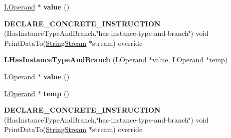 \begin{DoxyCompactItemize}
\item 
\hyperlink{classv8_1_1internal_1_1_l_operand}{L\+Operand} $\ast$ {\bfseries value} ()\hypertarget{classv8_1_1internal_1_1_l_has_instance_type_and_branch_a33c5f4ece667b3cc856cdba5e0ffa217}{}\label{classv8_1_1internal_1_1_l_has_instance_type_and_branch_a33c5f4ece667b3cc856cdba5e0ffa217}

\item 
{\bfseries D\+E\+C\+L\+A\+R\+E\+\_\+\+C\+O\+N\+C\+R\+E\+T\+E\+\_\+\+I\+N\+S\+T\+R\+U\+C\+T\+I\+ON} (Has\+Instance\+Type\+And\+Branch,\char`\"{}has-\/instance-\/type-\/and-\/branch\char`\"{}) void Print\+Data\+To(\hyperlink{classv8_1_1internal_1_1_string_stream}{String\+Stream} $\ast$stream) override\hypertarget{classv8_1_1internal_1_1_l_has_instance_type_and_branch_a3d0add74c6215d7b2c0629955bf970a3}{}\label{classv8_1_1internal_1_1_l_has_instance_type_and_branch_a3d0add74c6215d7b2c0629955bf970a3}

\item 
{\bfseries L\+Has\+Instance\+Type\+And\+Branch} (\hyperlink{classv8_1_1internal_1_1_l_operand}{L\+Operand} $\ast$value, \hyperlink{classv8_1_1internal_1_1_l_operand}{L\+Operand} $\ast$temp)\hypertarget{classv8_1_1internal_1_1_l_has_instance_type_and_branch_a724bc7736ff63c67353a3b18169626c5}{}\label{classv8_1_1internal_1_1_l_has_instance_type_and_branch_a724bc7736ff63c67353a3b18169626c5}

\item 
\hyperlink{classv8_1_1internal_1_1_l_operand}{L\+Operand} $\ast$ {\bfseries value} ()\hypertarget{classv8_1_1internal_1_1_l_has_instance_type_and_branch_a33c5f4ece667b3cc856cdba5e0ffa217}{}\label{classv8_1_1internal_1_1_l_has_instance_type_and_branch_a33c5f4ece667b3cc856cdba5e0ffa217}

\item 
\hyperlink{classv8_1_1internal_1_1_l_operand}{L\+Operand} $\ast$ {\bfseries temp} ()\hypertarget{classv8_1_1internal_1_1_l_has_instance_type_and_branch_a8cdfd4f289c9986c7e237c421380072f}{}\label{classv8_1_1internal_1_1_l_has_instance_type_and_branch_a8cdfd4f289c9986c7e237c421380072f}

\item 
{\bfseries D\+E\+C\+L\+A\+R\+E\+\_\+\+C\+O\+N\+C\+R\+E\+T\+E\+\_\+\+I\+N\+S\+T\+R\+U\+C\+T\+I\+ON} (Has\+Instance\+Type\+And\+Branch,\char`\"{}has-\/instance-\/type-\/and-\/branch\char`\"{}) void Print\+Data\+To(\hyperlink{classv8_1_1internal_1_1_string_stream}{String\+Stream} $\ast$stream) override\hypertarget{classv8_1_1internal_1_1_l_has_instance_type_and_branch_a3d0add74c6215d7b2c0629955bf970a3}{}\label{classv8_1_1internal_1_1_l_has_instance_type_and_branch_a3d0add74c6215d7b2c0629955bf970a3}

\end{DoxyCompactItemize}

